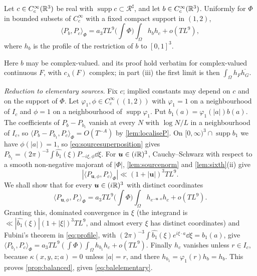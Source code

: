 \documentclass[11pt,colorlinks]{charlie}
\newcommand{\Om}{\Omega}
\newcommand{\ip}[2]{\langle #1,#2\rangle}
\begin{document}
\begin{proposition}\label{prop:balanced}
Let $c\in C_c^\infty(\mathbb{R}^3)$ be real with $\operatorname{supp}c\subset\mathcal R^\sharp$, and let $b\in C_c^\infty(\mathbb{R}^3)$. Uniformly for $\Phi$ in bounded subsets of $C_c^\infty$ with a fixed compact support in $(1,2)$,
\[
 \ip{P_b}{P_c}_\Phi=a_3TL^9\Big(\int\Phi\Big)\int_\Om h_bh_c+o(TL^9),
\]
where $h_b$ is the profile of the restriction of $b$ to $[0,1]^3$.
\end{proposition}
Here $b$ may be complex-valued.  and its proof hold verbatim for complex-valued continuous $F$, with $c_\lambda(F)$ complex; in part (iii) the first limit is then $\int_\Om h_F\overline{h_G}$.

\emph{Reduction to elementary sources.} Fix $c$; implied constants may depend on $c$ and on the support of $\Phi$. Let $\varphi_1,\phi\in C_c^\infty((1,2))$ with $\varphi_1=1$ on a neighbourhood of $I_c$ and $\phi=1$ on a neighbourhood of $\operatorname{supp}\varphi_1$. Put $b_1(a)=\varphi_1(|a|)b(a)$. The coefficients of $P_b-P_{b_1}$ vanish at every $N$ with $\log N/L$ in a neighbourhood of $I_c$, so $\ip{P_b-P_{b_1}}{P_c}_\Phi=O(T^{-A})$ by \cref{lem:localiseP}. On $[0,\infty)^3\cap\operatorname{supp}b_1$ we have $\phi(|a|)=1$, so \eqref{eq:sourcesuperposition} gives $P_{b_1}=(2\pi)^{-3}\int\widehat{b_1}(\xi)P_{-i\xi,\phi}\dd\xi$. For $\boldsymbol u\in(i\mathbb{R})^3$, Cauchy--Schwarz with respect to a smooth non-negative majorant of $|\Phi|$, \cref{lem:sourcenorm} and \cref{lem:sixth}(ii) give
\[
 |\ip{P_{\boldsymbol u,\phi}}{P_c}_\Phi|\ll(1+|\boldsymbol u|)^3TL^9 .
\]
We shall show that for every $\boldsymbol u\in(i\mathbb{R})^3$ with distinct coordinates
\begin{equation}\label{eq:balelementary}
 \ip{P_{\boldsymbol u,\phi}}{P_c}_\Phi=a_3TL^9\Big(\int\Phi\Big)\int_\Om h_{e^{-\boldsymbol u\cdot a}}h_c+o(TL^9).
\end{equation}
Granting this, dominated convergence in $\xi$ (the integrand is $\ll|\widehat{b_1}(\xi)|(1+|\xi|)^3TL^9$, and almost every $\xi$ has distinct coordinates) and Fubini's theorem in \eqref{eq:profile}, with $(2\pi)^{-3}\int\widehat{b_1}(\xi)e^{i\xi\cdot a}\dd\xi=b_1(a)$, give $\ip{P_{b_1}}{P_c}_\Phi=a_3TL^9(\int\Phi)\int_\Om h_{b_1}h_c+o(TL^9)$. Finally $h_c$ vanishes unless $r\in I_c$, because $\kappa(x,y,z;a)=0$ unless $|a|=r$, and there $h_{b_1}=\varphi_1(r)h_b=h_b$. This proves \cref{prop:balanced}, given \eqref{eq:balelementary}.
\end{document}
